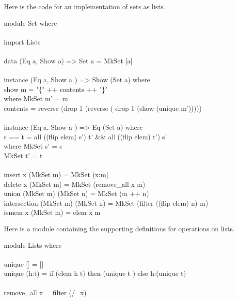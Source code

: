 \documentclass[11pt]{article}
\begin{document}



Here is the code for an implementation of sets as lists.

\begin{program*}
\> module Set where                \\
\>                 \\
\> import Lists                \\
\>                 \\
\> data (Eq a, Show a) => Set a = MkSet [a]                \\
\>                 \\
\> instance (Eq a, Show a ) => Show (Set a) where                \\
\>    show m = "\{" ++ contents ++ "\}"                 \\
\>      where MkSet m' = m                \\
\>            contents = reverse (drop 1 (reverse ( drop 1 (show (unique m')))))                \\
\>                 \\
\> instance (Eq a, Show a ) => Eq (Set a) where                \\
\>     s == t = all ((flip elem) s') t' \&\&  all ((flip elem) t') s'                 \\
\>                where MkSet s' = s                \\
\>                      MkSet t' = t                \\
\>                 \\
\> insert x (MkSet m) = MkSet (x:m)                \\
\> delete x (MkSet m) = MkSet (remove\_all x m)                \\
\> union (MkSet m) (MkSet n) = MkSet (m ++ n)                \\
\> intersection (MkSet m) (MkSet n) = MkSet (filter ((flip elem) n) m)                \\
\> ismem x (MkSet m) = elem x m                \\
\end{program*}

Here is a module containing the supporting definitions for operations on lists.

\begin{program*}
\> module Lists where                \\
\>  \\
\> unique [] = []                \\
\> unique (h:t) = if (elem h t) then (unique t ) else h:(unique t)                \\
\>                 \\
\> remove\_all x = filter (/=x)                \\
\end{program*}
\end{document}
